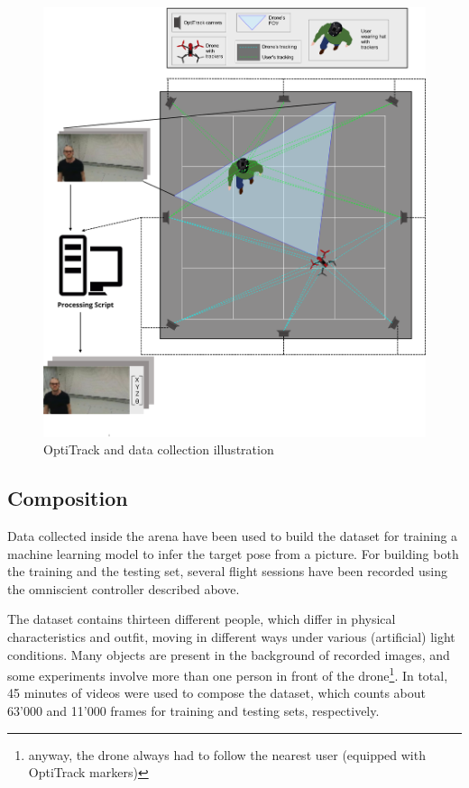 \begin{figure}[!htb]
	\centering
	\includegraphics[width=1\textwidth]{"contents/images/03-arena-demo-2"}
	\caption[OptiTrack and data collection illustration]{OptiTrack and data collection illustration \cite{mantegazza2018thesis}}
	\label{fig:drone-demo-2}
\end{figure}



\subsection{Composition}
\label{subsec:dataset-composition}

Data collected inside the arena have been used to build the dataset for training a machine learning model to infer the target pose from a picture. For building both the training and the testing set, several flight sessions have been recorded using the omniscient controller described above. 

The dataset contains thirteen different people, which differ in physical characteristics and outfit, moving in different ways under various (artificial) light conditions. Many objects are present in the background of recorded images, and some experiments involve more than one person in front of the drone\footnote{anyway, the drone always had to follow the nearest user (equipped with OptiTrack markers)}. In total, 45 minutes of videos were used to compose the dataset, which counts about 63'000 and 11'000 frames for training and testing sets, respectively.

